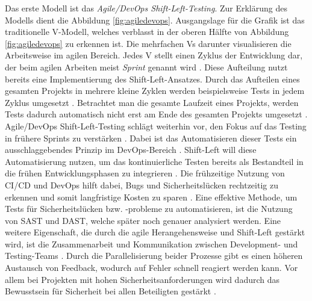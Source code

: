 Das erste Modell ist das \textit{Agile/DevOps Shift-Left-Testing}. Zur Erklärung des Modells dient die Abbildung \ref{fig:agiledevops}. Ausgangslage für die Grafik ist das traditionelle V-Modell, welches verblasst in der oberen Hälfte von Abbildung \ref{fig:agiledevops} zu erkennen ist. Die mehrfachen Vs darunter visualisieren die Arbeitsweise im agilen Bereich. Jedes V stellt einen Zyklus der Entwicklung dar, der beim agilen Arbeiten meist \textit{Sprint} genannt wird \cite{rani_shift-left_2023}. Diese Aufteilung nutzt bereits eine Implementierung des Shift-Left-Ansatzes. Durch das Aufteilen eines gesamten Projekts in mehrere kleine Zyklen werden beispielsweise Tests in jedem Zyklus umgesetzt \cite{rani_shift-left_2023}. Betrachtet man die gesamte Laufzeit eines Projekts, werden Tests dadurch automatisch nicht erst am Ende des gesamten Projekts umgesetzt \cite{bjerke-gulstuen_high_2015}. Agile/DevOps Shift-Left-Testing schlägt weiterhin vor, den Fokus auf das Testing in frühere Sprints zu verstärken \cite{bjerke-gulstuen_high_2015}. Dabei ist das Automatisieren dieser Tests ein ausschlaggebendes Prinzip im DevOps-Bereich \cite{rani_shift-left_2023}. Shift-Left will diese Automatisierung nutzen, um das kontinuierliche Testen bereits als Bestandteil in die frühen Entwicklungsphasen zu integrieren \cite{rani_shift-left_2023}. Die frühzeitige Nutzung von CI/CD und DevOps hilft dabei, Bugs und Sicherheitslücken rechtzeitig zu erkennen und somit langfristige Kosten zu sparen \cite{rani_shift-left_2023}. Eine effektive Methode, um Tests für Sicherheitslücken bzw. -probleme zu automatisieren, ist die Nutzung von SAST und DAST, welche später noch genauer analysiert werden. Eine weitere Eigenschaft, die durch die agile Herangehensweise und Shift-Left gestärkt wird, ist die Zusammenarbeit und Kommunikation zwischen Development- und Testing-Teams \cite{rani_shift-left_2023}. Durch die Parallelisierung beider Prozesse gibt es einen höheren Austausch von Feedback, wodurch auf Fehler schnell reagiert werden kann. Vor allem bei Projekten mit hohen Sicherheitsanforderungen wird dadurch das Bewusstsein für Sicherheit bei allen Beteiligten gestärkt \cite{dawoud_better_2024}.

